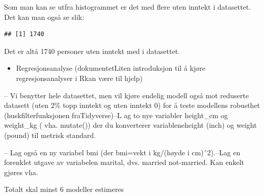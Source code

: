 \documentclass[
  12pt,
  norsk,
]{article}
\newenvironment{Shaded}{\begin{snugshade}}{\end{snugshade}}
\newcommand{\DecValTok}[1]{\textcolor[rgb]{0.00,0.00,0.81}{#1}}
\newcommand{\FunctionTok}[1]{\textcolor[rgb]{0.00,0.00,0.00}{#1}}
\newcommand{\NormalTok}[1]{#1}
\newcommand{\OtherTok}[1]{\textcolor[rgb]{0.56,0.35,0.01}{#1}}
\newcommand{\SpecialCharTok}[1]{\textcolor[rgb]{0.00,0.00,0.00}{#1}}
\providecommand{\tightlist}{%
  \setlength{\itemsep}{0pt}\setlength{\parskip}{0pt}}
\begin{document}
Som man kan se utfra histogrammet er det med flere uten inntekt i
datasettet. Det kan man også se slik:

\begin{Shaded}
\end{Shaded}

\begin{verbatim}
## [1] 1740
\end{verbatim}

Det er altå 1740 personer uten inntekt med i datasettet.

\begin{itemize}
\tightlist
\item
  Regresjonsanalyse (dokumentetLiten introduksjon til å kjøre
  regresjonsanalyser i Rkan være til hjelp)
\end{itemize}

\begin{Shaded}
\end{Shaded}

-- Vi benytter hele datasettet, men vil kjøre endelig modell også mot
reduserte datasett (uten 2\% topp inntekt og uten inntekt 0) for å teste
modellens robusthet (huskfilterfunksjonen fraTidyverse)--L ag to nye
variabler height\_cm og weight\_kg ( vha. mutate()) der du konverterer
variableneheight (inch) og weight (pound) til metrisk standard.

-- Lag også en ny variabel bmi (der bmi=vekt i kg/(høyde i cm)ˆ2).--Lag
en forenklet utgave av variabelen marital, dvs. married not-married. Kan
enkelt gjøres vha.

Totalt skal minst 6 modeller estimeres
\end{document}
